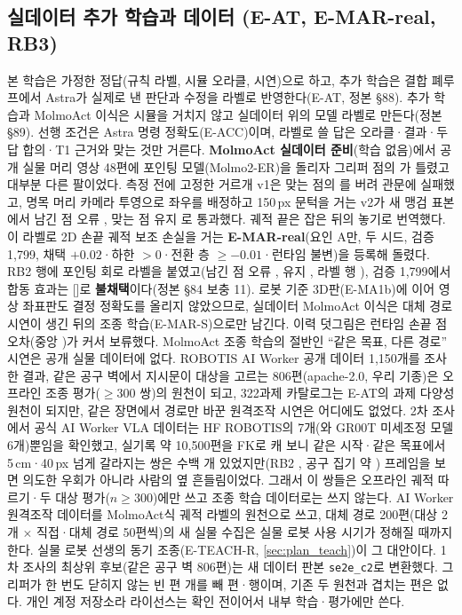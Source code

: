 \subsection{실데이터 추가 학습과 데이터 (E-AT, E-MAR-real, RB3)}
\label{sec:plan_real}
본 학습은 가정한 정답(규칙 라벨, 시뮬 오라클, 시연)으로 하고, 추가 학습은 결합 폐루프에서 Astra가 실제로 낸 판단과 수정을 라벨로 반영한다(E-AT, 정본 §88). 추가 학습과 MolmoAct 이식은 시뮬을 거치지 않고 실데이터 위의 모델 라벨로 만든다(정본 §89). 선행 조건은 Astra 명령 정확도(E-ACC)이며, 라벨로 쓸 답은 오라클·결과·두 답 합의·T1 근거와 맞는 것만 거른다. \textbf{MolmoAct 실데이터 준비}(학습 없음)에서 공개 실물 머리 영상 48편에 포인팅 모델(Molmo2-ER)을 돌리자 그리퍼 점의 가 틀렸고 대부분 다른 팔이었다. 측정 전에 고정한 거르개 v1은 맞는 점의 를 버려 관문에 실패했고, 명목 머리 카메라 투영으로 좌우를 배정하고 150\,px 문턱을 거는 v2가 새 맹검 표본에서 남긴 점 오류 , 맞는 점 유지 로 통과했다. 궤적 끝은 잡은 뒤의 놓기로 번역했다. 이 라벨로 2D 손끝 궤적 보조 손실을 거는 \textbf{E-MAR-real}(요인 A만, 두 시드, 검증 1,799, 채택 $+0.02$·하한 $>0$·전환 층 $\ge-0.01$·런타임 불변)을 등록해 돌렸다. RB2 행에 포인팅 회로 라벨을 붙였고(남긴 점 오류 , 유지 , 라벨 행 ), 검증 1,799에서 합동 효과는  []로 \textbf{불채택}이다(정본 §84 보충 11). 로봇 기준 3D판(E-MA1b)에 이어 영상 좌표판도 결정 정확도를 올리지 않았으므로, 실데이터 MolmoAct 이식은 대체 경로 시연이 생긴 뒤의 조종 학습(E-MAR-S)으로만 남긴다. 이력 덧그림은 런타임 손끝 점 오차(중앙 )가 커서 보류했다. MolmoAct 조종 학습의 절반인 ``같은 목표, 다른 경로'' 시연은 공개 실물 데이터에 없다. ROBOTIS AI Worker 공개 데이터 1,150개를 조사한 결과, 같은 공구 벽에서 지시문이 대상을 고르는 806편(apache-2.0, 우리 기종)은 오프라인 조종 평가($\ge$300 쌍)의 원천이 되고, 322과제 카탈로그는 E-AT의 과제 다양성 원천이 되지만, 같은 장면에서 경로만 바꾼 원격조작 시연은 어디에도 없었다. 2차 조사에서 공식 AI Worker VLA 데이터는 HF ROBOTIS의 7개(와 GR00T 미세조정 모델 6개)뿐임을 확인했고, 실기록 약 10,500편을 FK로 캐 보니 같은 시작·같은 목표에서 5\,cm·40\,px 넘게 갈라지는 쌍은 수백 개 있었지만(RB2 , 공구 집기 약 ) 프레임을 보면 의도한 우회가 아니라 사람의 옆 흔들림이었다. 그래서 이 쌍들은 오프라인 궤적 따르기·두 대상 평가($n\ge300$)에만 쓰고 조종 학습 데이터로는 쓰지 않는다. AI Worker 원격조작 데이터를 MolmoAct식 궤적 라벨의 원천으로 쓰고, 대체 경로 200편(대상 2개 $\times$ 직접·대체 경로 50편씩)의 새 실물 수집은 실물 로봇 사용 시기가 정해질 때까지 한다. 실물 로봇 선생의 동기 조종(E-TEACH-R, \cref{sec:plan_teach})이 그 대안이다. 1차 조사의 최상위 후보(같은 공구 벽 806편)는 새 데이터 판본 \texttt{se2e\_c2}로 변환했다. 그리퍼가 한 번도 닫히지 않는 빈 편 개를 빼 편·행이며, 기존 두 원천과 겹치는 편은 없다. 개인 계정 저장소라 라이선스는 확인 전이어서 내부 학습·평가에만 쓴다.


